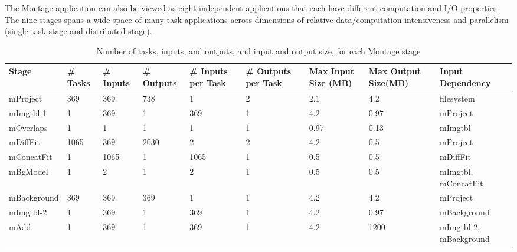 \documentclass{sig-alternate}
\newcommand{\zhaonote}[1]{{\textcolor{cyan}    { ***Zhao:      #1 }}}
\newcommand{\zhaonote}[1]{}
\begin{document}
The Montage application can also be viewed as eight independent applications that each have different computation and I/O properties. 
The nine stages spans a wide space of many-task applications across dimensions of relative data/computation intensiveness and parallelism (single task stage and distributed stage).

\begin{table}[ht]
\begin{center}
    \caption{Number of tasks, inputs, and outputs, and input and output size, for each Montage stage}
    \begin{scriptsize}
    \begin{tabular}{ | p{1.6cm} | p{0.8cm} | p{0.8cm} | p{1.2cm} | p{1cm} | p{1.1cm} | p{1.1cm} | p{1.2cm} | p{2.7cm} |}
    \hline
    Stage & \# Tasks & \# Inputs & \# Outputs & \# Inputs per Task & \# Outputs per Task & Max Input Size (MB) & Max Output Size(MB) & Input Dependency\\ \hline \hline
	mProject & 369 & 369 & 738 & 1 & 2 & 2.1 & 4.2 & filesystem \\ \hline
	mImgtbl-1 & 1 & 369 & 1 & 369 & 1 & 4.2 & 0.97 & mProject\\ \hline
	mOverlaps & 1 & 1 & 1 & 1 & 1 & 0.97 & 0.13 & mImgtbl\\ \hline
	mDiffFit & 1065 & 369 & 2030 & 2 & 2 & 4.2 & 0.5 & mProject\\ \hline
	mConcatFit & 1 & 1065 & 1 & 1065 & 1 & 0.5 & 0.5 & mDiffFit\\ \hline
	mBgModel & 1 & 2 & 1 & 2 & 1 & 0.5 & 0.5 & mImgtbl, mConcatFit\\ \hline
	mBackground & 369 & 369 & 369 & 1 & 1 & 4.2 & 4.2 & mProject\\ \hline
	mImgtbl-2 & 1 & 369 & 1 & 369 & 1 & 4.2 & 0.97 & mBackground\\ \hline
	mAdd  & 1 & 369 & 1 & 369 & 1 & 4.2 & 1200 & mImgtbl-2, mBackground\\ \hline
    \end{tabular}
    \end{scriptsize}
    \label{tb:montage-stats}
\end{center}   
\end{table} 
\end{document}
